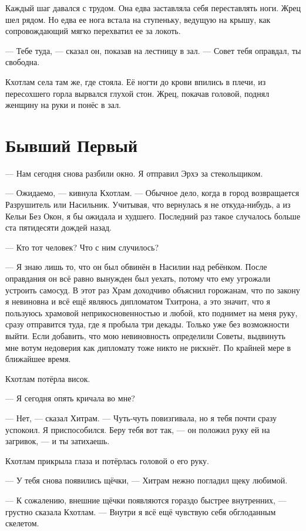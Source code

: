 Каждый шаг давался с трудом.
Она едва заставляла себя переставлять ноги.
Жрец шел рядом.
Но едва ее нога встала на ступеньку, ведущую на крышу, как сопровождающий мягко перехватил ее за локоть.

--- Тебе туда, --- сказал он, показав на лестницу в зал.
--- Совет тебя оправдал, ты свободна.

Кхотлам села там же, где стояла.
Её ногти до крови впились в плечи, из пересохшего горла вырвался глухой стон.
Жрец, покачав головой, поднял женщину на руки и понёс в зал.

\section{Бывший Первый}

--- Нам сегодня снова разбили окно.
Я отправил Эрхэ за стекольщиком.

--- Ожидаемо, --- кивнула Кхотлам.
--- Обычное дело, когда в город возвращается Разрушитель или Насильник.
Учитывая, что вернулась я не откуда-нибудь, а из Кельи Без Окон, я бы ожидала и худшего.
Последний раз такое случалось больше ста пятидесяти дождей назад.

--- Кто тот человек?
Что с ним случилось?

--- Я знаю лишь то, что он был обвинён в Насилии над ребёнком.
После оправдания он всё равно вынужден был уехать, потому что ему угрожали устроить самосуд.
В этот раз Храм доходчиво объяснил горожанам, что по закону я невиновна и всё ещё являюсь дипломатом Тхитрона, а это значит, что я пользуюсь храмовой неприкосновенностью и любой, кто поднимет на меня руку, сразу отправится туда, где я пробыла три декады.
Только уже без возможности выйти.
Если добавить, что мою невиновность определили Советы, выдвинуть мне вотум недоверия как дипломату тоже никто не рискнёт.
По крайней мере в ближайшее время.

Кхотлам потёрла висок.

--- Я сегодня опять кричала во мне?

--- Нет, --- сказал Хитрам.
--- Чуть-чуть повизгивала, но я тебя почти сразу успокоил.
Я приспособился.
Беру тебя вот так, --- он положил руку ей на загривок, --- и ты затихаешь.

Кхотлам прикрыла глаза и потёрлась головой о его руку.

--- У тебя снова появились щёчки, --- Хитрам нежно погладил щеку любимой.

--- К сожалению, внешние щёчки появляются гораздо быстрее внутренних, --- грустно сказала Кхотлам.
--- Внутри я всё ещё чувствую себя обглоданным скелетом.


